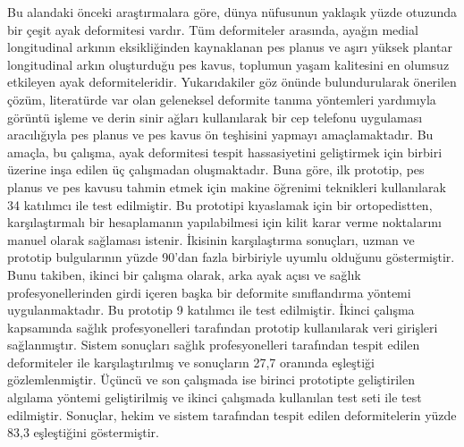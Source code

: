 \begin{turkishabstract}\label{chp:turkishabstract}

Bu alandaki önceki araştırmalara göre, dünya nüfusunun yaklaşık yüzde otuzunda bir çeşit ayak deformitesi vardır. Tüm deformiteler arasında, ayağın medial longitudinal arkının eksikliğinden kaynaklanan pes planus ve aşırı yüksek plantar longitudinal arkın oluşturduğu pes kavus, toplumun yaşam kalitesini en olumsuz etkileyen ayak deformiteleridir. Yukarıdakiler göz önünde bulundurularak önerilen çözüm, literatürde var olan geleneksel deformite tanıma yöntemleri yardımıyla görüntü işleme ve derin sinir ağları kullanılarak bir cep telefonu uygulaması aracılığıyla pes planus ve pes kavus ön teşhisini yapmayı amaçlamaktadır. Bu amaçla, bu çalışma, ayak deformitesi tespit hassasiyetini geliştirmek için birbiri üzerine inşa edilen üç çalışmadan oluşmaktadır. Buna göre, ilk prototip, pes planus ve pes kavusu tahmin etmek için makine öğrenimi teknikleri kullanılarak 34 katılımcı ile test edilmiştir. Bu prototipi kıyaslamak için bir ortopedistten, karşılaştırmalı bir hesaplamanın yapılabilmesi için kilit karar verme noktalarını manuel olarak sağlaması istenir. İkisinin karşılaştırma sonuçları, uzman ve prototip bulgularının yüzde 90'dan fazla birbiriyle uyumlu olduğunu göstermiştir. Bunu takiben, ikinci bir çalışma olarak, arka ayak açısı ve sağlık profesyonellerinden girdi içeren başka bir deformite sınıflandırma yöntemi uygulanmaktadır. Bu prototip 9 katılımcı ile test edilmiştir. İkinci çalışma kapsamında sağlık profesyonelleri tarafından prototip kullanılarak veri girişleri sağlanmıştır. Sistem sonuçları sağlık profesyonelleri tarafından tespit edilen deformiteler ile karşılaştırılmış ve sonuçların 27,7 oranında eşleştiği gözlemlenmiştir. Üçüncü ve son çalışmada ise birinci prototipte geliştirilen algılama yöntemi geliştirilmiş ve ikinci çalışmada kullanılan test seti ile test edilmiştir. Sonuçlar, hekim ve sistem tarafından tespit edilen deformitelerin yüzde 83,3 eşleştiğini göstermiştir.

\end{turkishabstract}
